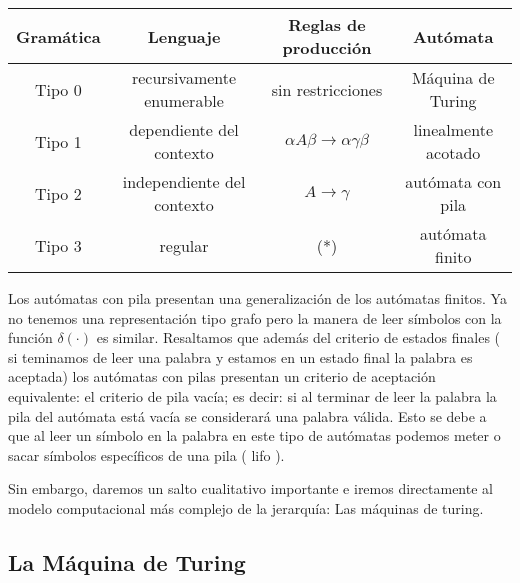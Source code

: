 \begin{center}
	\begin{tabular}{|c|c|c|c|}
		\hline 
		Gramática & Lenguaje  &Reglas de producción   & Autómata  \\ 
		\hline 
		Tipo 0	& recursivamente enumerable  & sin restricciones  & Máquina de Turing  \\ 
		\hline 
		Tipo 1	& dependiente del contexto  & $\alpha A \beta \rightarrow \alpha \gamma \beta$ & linealmente acotado  \\ 
		\hline 
		Tipo 2	& independiente del contexto  & $A \rightarrow \gamma $  & autómata con pila   \\ 
		\hline 
		Tipo 3	& regular  & (*) & autómata finito \\
		\hline 
	\end{tabular} 
\end{center}

\vspace{1cm}

Los autómatas con pila presentan una generalización de los autómatas finitos. Ya no tenemos una representación tipo grafo pero la manera de leer símbolos con la función $\delta(\cdot)$ es similar. Resaltamos que además del criterio de estados finales ( si teminamos de leer una palabra y estamos en un estado final la palabra es aceptada) los autómatas con pilas presentan un criterio de aceptación equivalente: el criterio de pila vacía; es decir: si al terminar de leer la palabra la pila del autómata está vacía se considerará una palabra válida. Esto se debe a que al leer un símbolo en la palabra en este tipo de autómatas podemos meter o sacar símbolos específicos de una pila ( lifo ).

Sin embargo, daremos un salto cualitativo importante e iremos directamente al modelo computacional más complejo de la jerarquía: Las máquinas de turing.



\subsection{La Máquina de Turing}





\newpage
	
